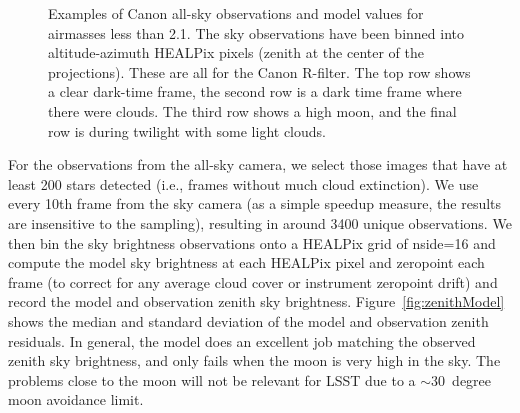 \documentclass[]{spie}
\begin{document}
\begin{figure}[ht]
\begin{center}
  \end{center}
  \caption{Examples of Canon all-sky observations and model values for airmasses less than 2.1. The sky observations have been binned into altitude-azimuth HEALPix pixels (zenith at the center of the projections). These are all for the Canon R-filter. The top row shows a clear dark-time frame, the second row is a dark time frame where there were clouds. The third row shows a high moon, and the final row is during twilight with some light clouds. \label{fig:skyExamples}}
\end{figure}


For the observations from the all-sky camera, we select those images that have at least 200 stars detected  (i.e., frames without much cloud extinction). We use every 10th frame from the sky camera (as a simple speedup measure, the results are insensitive to the sampling), resulting in around 3400 unique observations.  We then bin the sky brightness observations onto a HEALPix grid of nside=16 and compute the model sky brightness at each HEALPix pixel and zeropoint each frame (to correct for any average cloud cover or instrument zeropoint drift) and record the model and observation zenith sky brightness. Figure~\ref{fig:zenithModel} shows the median and standard deviation of the model and observation zenith residuals.  In general, the model does an excellent job matching the observed zenith sky brightness, and only fails when the moon is very high in the sky.  The problems close to the moon will not be relevant for LSST due to a $\sim30$\ degree moon avoidance limit.
\end{document}
